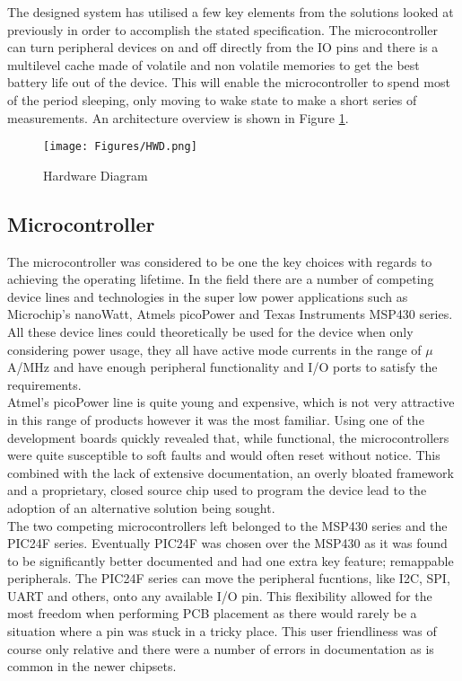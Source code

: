 \documentclass[12pt,openany,a4paper]{book}
\begin{document}
		The designed system has utilised a few key elements from the solutions looked at previously in order to accomplish the stated specification. The microcontroller can turn peripheral devices on and off directly from the IO pins and there is a multilevel cache made of volatile and non volatile memories to get the best battery life out of the device. This will enable the microcontroller to spend most of the period sleeping, only moving to wake state to make a short series of measurements. An architecture overview is shown in Figure \ref{fig:HWD}.
		
		\begin{figure}[H]
			\centering
			\texttt{[image: Figures/HWD.png]}
			\caption{Hardware Diagram}
			\label{fig:HWD}
		\end{figure}		

		
		\subsection{Microcontroller}
		The microcontroller was considered to be one the key choices with regards to achieving the operating lifetime. In the field there are a number of competing device lines and technologies in the super low power applications such as Microchip's nanoWatt, Atmels picoPower and Texas Instruments MSP430 series. \\
		
		All these device lines could theoretically be used for the device when only considering power usage, they all have active mode currents in the range of $\mu$A/MHz and have enough peripheral functionality and I/O ports to satisfy the requirements. \\
		
		Atmel's picoPower line is quite young and expensive, which is not very attractive in this range of products however it was the most familiar. Using one of the development boards quickly revealed that, while functional, the microcontrollers were quite susceptible to soft faults and would often reset without notice. This combined with the lack of extensive documentation, an overly bloated framework and a proprietary, closed source chip used to program the device lead to the adoption of an alternative solution being sought. \\
		
		The two competing microcontrollers left belonged to the MSP430 series and the PIC24F series. Eventually PIC24F was chosen over the MSP430 as it was found to be significantly better documented and had one extra key feature; remappable peripherals. The PIC24F series can move the peripheral fucntions, like I2C, SPI, UART and others, onto any available I/O pin. This flexibility allowed for the most freedom when performing PCB placement as there would rarely be a situation where a pin was stuck in a tricky place. This user friendliness was of course only relative and there were a number of errors in documentation as is common in the newer chipsets. \\
		
\end{document}
